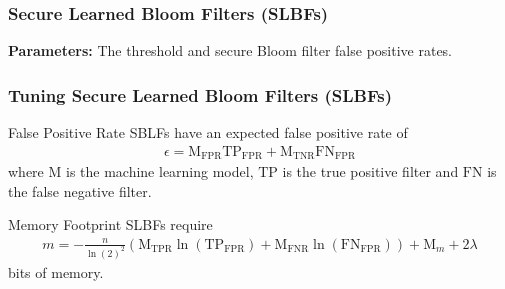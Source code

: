 \documentclass{beamer}
\begin{document}

\begin{frame}
\frametitle{Secure Learned Bloom Filters (SLBFs) \cite{bishop_tirmazi_2025}}

\begin{center}
    

    \vspace{1em}

    \textbf{Parameters:} The threshold and secure Bloom filter false positive rates.
\end{center}

\end{frame}


\begin{frame}
\frametitle{Tuning Secure Learned Bloom Filters (SLBFs)}

\begin{block}{False Positive Rate \cite{bishop_tirmazi_2025}}
    SBLFs have an expected false positive rate of
    \begin{align*}
        \epsilon = \text{M}_\text{FPR} \text{TP}_\text{FPR} + \text{M}_\text{TNR} \text{FN}_\text{FPR}
    \end{align*}
    where $\text{M}$ is the machine learning model, $\text{TP}$ is the true positive filter and $\text{FN}$ is the false negative filter.
\end{block}

\begin{block}{Memory Footprint}
    SLBFs require
    \begin{align*}
        m = -\frac{n}{\ln(2)^2} \left( \text{M}_\text{TPR} \ln(\text{TP}_\text{FPR}) + \text{M}_\text{FNR} \ln(\text{FN}_\text{FPR}) \right) + \text{M}_m + 2 \lambda
    \end{align*}
    bits of memory.
\end{block}

\end{frame}
\end{document}

